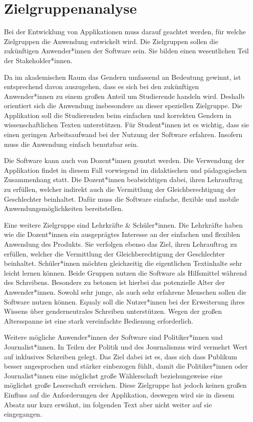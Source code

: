 \section{Zielgruppenanalyse}
\label{sec:zielgruppenanalyse}

Bei der Entwicklung von Applikationen muss darauf geachtet werden, für welche Zielgruppen die Anwendung entwickelt wird. Die Zielgruppen sollen die zukünftigen Anwender*innen der Software sein. Sie bilden einen wesentlichen Teil der Stakeholder*innen.

Da im akademischen Raum das Gendern umfassend an Bedeutung gewinnt, ist entsprechend davon auszugehen, dass es sich bei den zukünftigen Anwender*innen zu einem großen Anteil um Studierende handeln wird. Deshalb orientiert sich die Anwendung insbesondere an dieser speziellen Zielgruppe. Die Applikation soll die Studierenden beim einfachen und korrekten Gendern in wissenschaftlichen Texten unterstützen. Für Student*innen ist es wichtig, dass sie einen geringen Arbeitsaufwand bei der Nutzung der Software erfahren. Insofern muss die Anwendung einfach benutzbar sein.

Die Software kann auch von Dozent*innen genutzt werden. Die Verwendung der Applikation findet in diesem Fall vorwiegend im didaktischen und pädagogischen Zusammenhang statt. Die Dozent*innen beabsichtigen dabei, ihren Lehrauftrag zu erfüllen, welcher indirekt auch die Vermittlung der Gleichberechtigung der Geschlechter beinhaltet. Dafür muss die Software einfache, flexible und mobile Anwendungsmöglichkeiten bereitstellen.

Eine weitere Zielgruppe sind Lehrkräfte \& Schüler*innen. Die Lehrkräfte haben wie die Dozent*innen ein ausgeprägtes Interesse an der einfachen und flexiblen Anwendung des Produkts. Sie verfolgen ebenso das Ziel, ihren Lehrauftrag zu erfüllen, welcher die Vermittlung der Gleichberechtigung der Geschlechter beinhaltet. Schüler*innen möchten gleichzeitig die eigentlichen Textinhalte sehr leicht lernen können. Beide Gruppen nutzen die Software als Hilfsmittel während des Schreibens. Besonders zu betonen ist hierbei das potenzielle Alter der Anwender*innen. Sowohl sehr junge, als auch sehr erfahrene Menschen sollen die Software nutzen können. Equaly soll die Nutzer*innen bei der Erweiterung ihres Wissens über genderneutrales Schreiben unterstützen. Wegen der großen Altersspanne ist eine stark vereinfachte Bedienung erforderlich.

Weitere mögliche Anwender*innen der Software sind Politiker*innen und Journalist*innen. In Teilen der Politik und des Journalismus wird vermehrt Wert auf inklusives Schreiben gelegt. Das Ziel dabei ist es, dass sich dass Publikum besser angesprochen und stärker einbezogen fühlt, damit die Politiker*innen oder Journalist*innen eine möglichst große Wählerschaft beziehungsweise eine möglichst große Leserschaft erreichen. Diese Zielgruppe hat jedoch keinen großen Einfluss auf die Anforderungen der Applikation, deswegen wird sie in diesem Absatz nur kurz erwähnt, im folgenden Text aber nicht weiter auf sie eingegangen.